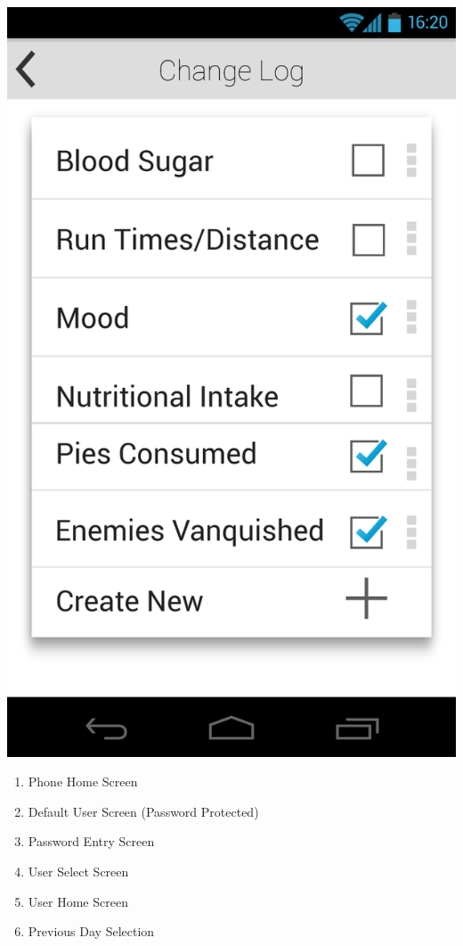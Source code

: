 \documentclass[pdftex,12pt,a4paper]{report}
\begin{document}
\begin{center}
	\includegraphics[scale=0.18]{Screens/05-Change-Log--Null.png}
\end{center}
\begin{minipage}{0.5\textwidth}
\begin{enumerate}
\item{Phone Home Screen}
\item{Default User Screen (Password Protected)}
\item{Password Entry Screen}
\item{User Select Screen}
\item{User Home Screen}
\item{Previous Day Selection}
\end{enumerate}
\hfill
\end{minipage}
\end{document}
